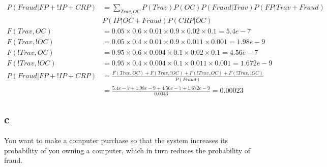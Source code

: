 \documentclass[11pt]{article}
\begin{document}
\begin{align*}
  P(Fraud | FP + !IP + CRP) &= \sum_{Trav, OC} P(Trav) P(OC) P(Fraud | Trav) P(FP | Trav + Fraud) \\
  &P(IP | OC + Fraud) P(CRP | OC) \\
  F(Trav, OC) &= 0.05 \times 0.6 \times 0.01 \times 0.9 \times 0.02 \times 0.1 = 5.4e-7 \\
  F(Trav, !OC) &= 0.05 \times 0.4 \times 0.01 \times 0.9 \times 0.011 \times 0.001 = 1.98e-9 \\
  F(!Trav, OC) &= 0.95 \times 0.6 \times 0.004 \times 0.1 \times 0.02 \times 0.1 = 4.56e-7 \\
  F(!Trav, !OC) &= 0.95 \times 0.4 \times 0.004 \times 0.1 \times 0.011 \times 0.001 = 1.672e-9 \\
  P(Fraud | FP + !IP + CRP) &= \frac{F(Trav, OC) + F(Trav, !OC) + F(!Trav, OC) + F(!Trav, !OC)}{P(Fraud)} \\
  &= \frac{5.4e-7 + 1.98e-9 + 4.56e-7 + 1.672e-9}{0.0043} = 0.00023
\end{align*}

\subsection{c}

You want to make a computer purchase so that the system increases its probability of you owning a computer, which in turn reduces the probability of fraud.
\end{document}
